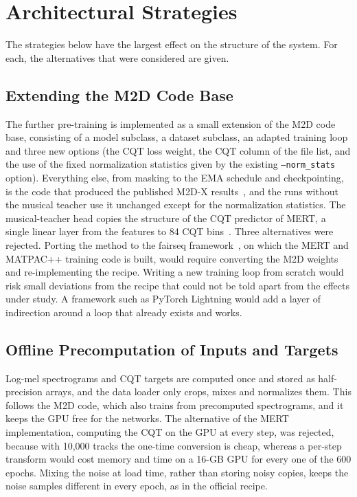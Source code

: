\documentclass{FastFyp}
\begin{document}
\section{Architectural Strategies}
\label{sec:des-strategies}
The strategies below have the largest effect on the structure of the system. For each, the alternatives that were considered are given.

\subsection{Extending the M2D Code Base}
The further pre-training is implemented as a small extension of the M2D code base, consisting of a model subclass, a dataset subclass, an adapted training loop and three new options (the CQT loss weight, the CQT column of the file list, and the use of the fixed normalization statistics given by the existing \texttt{--norm\_stats} option). Everything else, from masking to the EMA schedule and checkpointing, is the code that produced the published M2D-X results~\cite{ref:Niizumi:2024m2dx}, and the runs without the musical teacher use it unchanged except for the normalization statistics. The musical-teacher head copies the structure of the CQT predictor of MERT, a single linear layer from the features to 84 CQT bins~\cite{ref:MERTGit}. Three alternatives were rejected. Porting the method to the fairseq framework~\cite{ref:Ott:2019fairseq}, on which the MERT and MATPAC++ training code is built, would require converting the M2D weights and re-implementing the recipe. Writing a new training loop from scratch would risk small deviations from the recipe that could not be told apart from the effects under study. A framework such as PyTorch Lightning would add a layer of indirection around a loop that already exists and works.

\subsection{Offline Precomputation of Inputs and Targets}
Log-mel spectrograms and CQT targets are computed once and stored as half-precision arrays, and the data loader only crops, mixes and normalizes them. This follows the M2D code, which also trains from precomputed spectrograms, and it keeps the GPU free for the networks. The alternative of the MERT implementation, computing the CQT on the GPU at every step, was rejected, because with 10,000 tracks the one-time conversion is cheap, whereas a per-step transform would cost memory and time on a 16-GB GPU for every one of the 600 epochs. Mixing the noise at load time, rather than storing noisy copies, keeps the noise samples different in every epoch, as in the official recipe.
\end{document}
